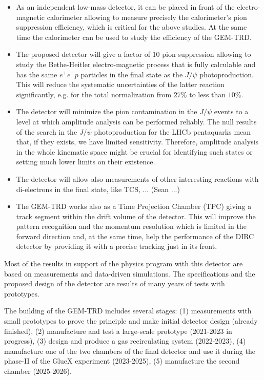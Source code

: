 \documentclass[%
preprint,
nofootinbib,
 amsmath,amssymb,
 aps,
floatfix,
]{revtex4-1}
\begin{document}
\begin{itemize}
\item As an independent low-mass detector, it  can be placed in front of 
the electro-magnetic calorimeter allowing to measure precisely
the calorimeter's pion suppression efficiency, 
which is critical for the above studies.
At the same time the calorimeter can be used to study the efficiency
of the GEM-TRD.
\item The proposed detector will give a factor of 10 pion suppression allowing
to study the Bethe-Heitler electro-magnetic process 
that is fully calculable and has the same $e^+e^-p$ particles
in the final state as the $J/\psi $ photoproduction.
This will reduce the systematic uncertainties
 of the latter reaction significantly,
e.g. for the total normalization from $27$\% to less than $10$\%. 
\item The detector will minimize the pion contamination
in the $J/\psi $ events to a level at which amplitude analysis
can be performed reliably.
The null results \cite{prl_gluex,JP007} of the search in the
$J/\psi $ photoproduction for the LHCb pentaquarks \cite{LHCb1,LHCb2} mean that,
if they exists, we have limited sensitivity.
Therefore, amplitude analysis in the whole kinematic space 
might be crucial for identifying such states or setting much lower
limits on their existence.
\item The detector will allow also measurements of other 
interesting reactions with di-electrons in the final state, like TCS, ... (Sean ...)
\item The GEM-TRD works also as a Time Projection Chamber (TPC)
giving a track segment within the drift volume of the detector.
This will improve the pattern recognition and the momentum resolution 
which is limited in the forward direction and, 
at the same time, help the performance
of the DIRC detector by providing it with a precise tracking
just in its front.
\end{itemize}

Most of the results in support of the physics program with this detector are based on measurements
and data-driven simulations.
The specifications and the proposed design of the detector are results 
of many years of tests with prototypes.

The building of the GEM-TRD includes several stages:
(1) measurements with small prototypes to prove the principle
and make initial detector design (already finished),
(2) manufacture and test a large-scale prototype (2021-2023 in progress), 
(3) design and produce a gas recirculating system (2022-2023),
(4) manufacture one of the two chambers of the final detector
and use it during the phase-II of the GlueX experiment (2023-2025),
(5) manufacture the second chamber (2025-2026).
\end{document}
